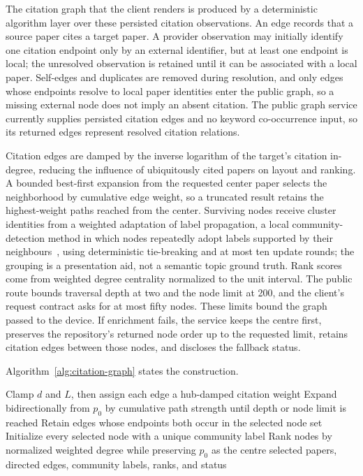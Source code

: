 The citation graph that the client renders is produced by a deterministic algorithm layer over these persisted citation observations. An edge records that a source paper cites a target paper. A provider observation may initially identify one citation endpoint only by an external identifier, but at least one endpoint is local; the unresolved observation is retained until it can be associated with a local paper. Self-edges and duplicates are removed during resolution, and only edges whose endpoints resolve to local paper identities enter the public graph, so a missing external node does not imply an absent citation.
The public graph service currently supplies persisted citation edges and no keyword co-occurrence input, so its returned edges represent resolved citation relations.

Citation edges are damped by the inverse logarithm of the target's citation in-degree, reducing the influence of ubiquitously cited papers on layout and ranking.
A bounded best-first expansion from the requested center paper selects the neighborhood by cumulative edge weight, so a truncated result retains the highest-weight paths reached from the center.
Surviving nodes receive cluster identities from a weighted adaptation of label propagation, a local community-detection method in which nodes repeatedly adopt labels supported by their neighbours~\cite{raghavan2007label}, using deterministic tie-breaking and at most ten update rounds; the grouping is a presentation aid, not a semantic topic ground truth. Rank scores come from weighted degree centrality normalized to the unit interval.
The public route bounds traversal depth at two and the node limit at 200, and the client's request contract asks for at most fifty nodes. These limits bound the graph passed to the device. If enrichment fails, the service keeps the centre first, preserves the repository's returned node order up to the requested limit, retains citation edges between those nodes, and discloses the fallback status.

Algorithm~\ref{alg:citation-graph} states the construction.

\begin{algorithm}[htbp]
  \caption{Bounded citation-graph view construction}
  \label{alg:citation-graph}
  Clamp \(d\) and \(L\), then assign each edge a hub-damped citation weight\;
  Expand bidirectionally from \(p_0\) by cumulative path strength until depth or node limit is reached\;
  Retain edges whose endpoints both occur in the selected node set\;
  Initialize every selected node with a unique community label\;
  Rank nodes by normalized weighted degree while preserving \(p_0\) as the centre\;
  \Return selected papers, directed edges, community labels, ranks, and status\;
\end{algorithm}


